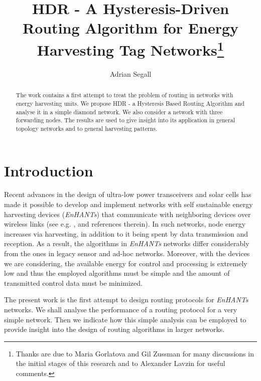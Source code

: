 \documentclass[12 pt]{article}
\newcommand{\debug}[1]{\mbox{\tt #1}}
\renewcommand{\debug}[1]{}              \newcommand{\cmd}[1]{}
\newcommand{\2}{\>\>}
\newcommand{\3}{\>\>\>}
\newcommand{\4}{\>\>\>\>}
\newcommand{\5}{\>\>\>\>\>}
\newcommand{\6}{\>\>\>\>\>\>}
\newcommand{\7}{\6\>}
\newcommand{\8}{\6\2}
\newcommand{\sname}{}
\newcommand{\dcite}[1]{\cite{#1}\debug{[#1]}\cmd{dcite}}
\newcommand{\dlabelx}[1]{\debug{\fbox{\tiny #1}}\label{#1}}
\newcommand{\msec}[2]{\renewcommand{\sname}{}\section[#1
	\debug{\fbox {#2}}]{#1 \cmd{msec} \dlabelx{#2}}\markboth{\today}{Sec. \thesection}}
\begin{document}
\clearpage
\thispagestyle{empty}

\title{
HDR - A Hysteresis-Driven Routing Algorithm for Energy Harvesting Tag Networks\footnote{Thanks are due to Maria Gorlatova and Gil Zussman for many discussions in the initial stages of this research and to Alexander Lavzin for useful comments.} \\
}
\author{Adrian Segall}

\maketitle


\begin{abstract}
The work contains a first attempt to treat the problem of routing in networks with energy harvesting units.  We propose HDR - a Hysteresis Based Routing Algorithm and analyse it in a simple diamond network.  We also consider a network with three forwarding nodes.  The results are used to give insight into its application in general topology networks and to general harvesting patterns.
\end{abstract}

\newpage
\clearpage
\tableofcontents
\clearpage
{}



\newpage

\newcommand{\fname}{consensus.tex}





\msec{Introduction}{Introduction}


Recent advances in the design of ultra-low power transceivers and solar cells has made it possible to develop and implement networks with self sustainable energy harvesting devices (\emph{EnHANTs}) that communicate with neighboring devices over wireless links (see e.g. \dcite{GWZ}, \dcite{GMSplus} and references therein).  In such networks, node energy increases via harvesting, in addition to it being spent by data transmission and reception.  As a result, the algorithms in \emph{EnHANTs} networks differ considerably from the ones in legacy sensor and ad-hoc networks.  Moreover, with the devices we are considering, the available energy for control and processing is extremely low and thus the employed algorithms must be simple and the amount of transmitted control data must be minimized.

The present work is the first attempt to design routing protocols for \emph{EnHANTs} networks.  We shall analyse the performance of a routing protocol for a very simple network.  Then we indicate how this simple analysis can be employed to provide insight into the design of routing algorithms in larger networks.
\end{document}
